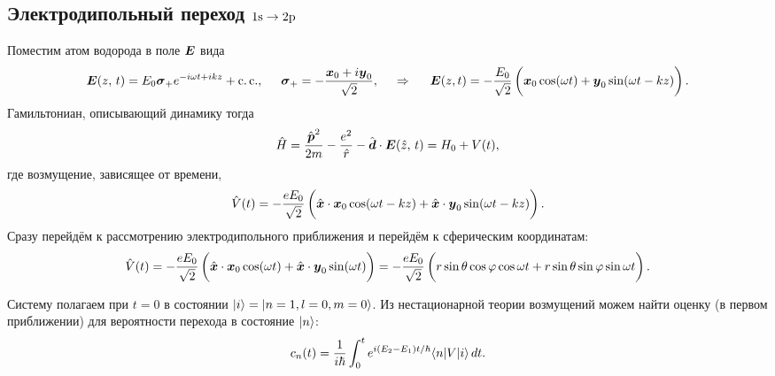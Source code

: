 \setcounter{section}{1}
\setcounter{subsection}{2}
\subsection{Электродипольный переход \texorpdfstring{$1\textnormal{s}\to 2\textnormal{p}$}{1s -> 2p}}



Поместим атом водорода в поле $\mbox{\boldmath $E$}$ вида
\begin{equation*}
    \vc{E} (z,\, t) = E_0 \vc{\sigma}_+ e^{-i \omega t + i k z} + \cc, 
    \hspace{5 mm} 
    \vc{\sigma}_+ = - \frac{\vc{x}_0 + i \vc{y}_0}{\sqrt{2}},
    \hspace{0.5cm} \Rightarrow \hspace{0.5cm}   
    \vc{E} (z, t) = - \frac{{E}_0}{\sqrt{2}} \left(
        \vp
        \vc{x}_0 \cos(\omega t) + \vc{y}_0 \sin(\omega t - k z)
    \right).
\end{equation*}
Гамильтониан, описывающий динамику тогда
\begin{equation*}
    \hat{H} = \frac{\hat{\mbox{\boldmath $p$}}^2}{2 m} - \frac{e^2}{\hat{r}} - \hat{\mbox{\boldmath $d$}} \cdot \mbox{\boldmath $E$} (\hat{z},\, t) = H_0 + V(t),
\end{equation*}
где возмущение, зависящее от времени,
\begin{equation*}
    \hat{V}(t) = - \frac{e E_0}{\sqrt{2}} \left( \vp
        \hat{\vc{x}} \cdot\vc{x}_0 \cos(\omega t - kz) +\hat{\vc{x}} \cdot \vc{y}_0 \sin(\omega t - k z)
    \right).
\end{equation*}
Сразу перейдём к рассмотрению электродипольного приближения и перейдём к сферическим координатам:
\begin{equation*}
    \hat{V}(t) = - \frac{e E_0}{\sqrt{2}} \left( \vp
        \hat{\vc{x}} \cdot\vc{x}_0 \cos(\omega t) +\hat{\vc{x}} \cdot \vc{y}_0 \sin(\omega t)
    \right)
    =
    - \frac{e E_0}{\sqrt{2}} \left( \vp
        r \sin \theta \cos \varphi \cos \omega t +
        r \sin \theta \sin \varphi \sin \omega t
    \right)
    .
\end{equation*}

Систему полагаем при $t=0$ в состоянии $\left| i \right\rangle = \left| n=1,l=0,m=0 \right\rangle$. Из нестационарной теории возмущений можем найти оценку (в первом приближении) для вероятности перехода в состояние $\left| n \right\rangle$:
\begin{equation*}
    c_n (t) = \frac{1}{i \hbar} \int_0^t e^{i (E_2-E_1)t/\hbar} \bk{n}[V]{i} \d t.
\end{equation*}



